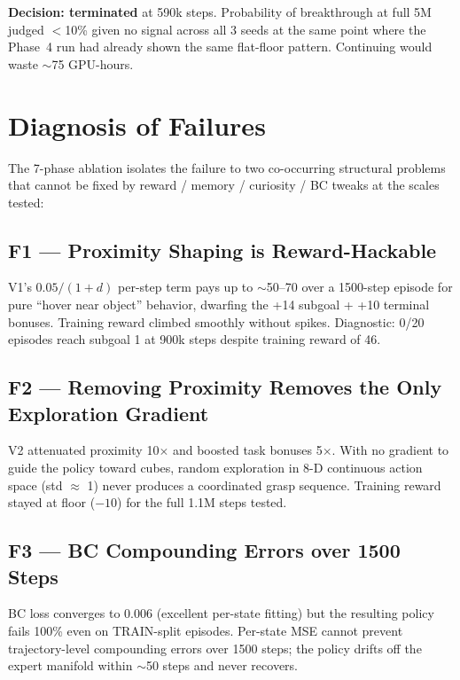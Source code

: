 \documentclass[11pt,letterpaper]{article}
\begin{document}
\begin{finding}
\textbf{Decision: terminated} at 590k steps.
Probability of breakthrough at full 5M judged $<$10\% given no signal across
all 3 seeds at the same point where the Phase~4 run had already shown the same
flat-floor pattern. Continuing would waste $\sim$75 GPU-hours.
\end{finding}

\section{Diagnosis of Failures}
\label{sec:diagnosis}

The 7-phase ablation isolates the failure to two co-occurring structural problems
that cannot be fixed by reward / memory / curiosity / BC tweaks at the scales tested:

\subsection{F1 — Proximity Shaping is Reward-Hackable}

V1's $0.05/(1+d)$ per-step term pays up to $\sim$50–70 over a 1500-step episode
for pure ``hover near object'' behavior, dwarfing the +14 subgoal + +10 terminal
bonuses. Training reward climbed smoothly without spikes. Diagnostic: 0/20
episodes reach subgoal 1 at 900k steps despite training reward of 46.

\subsection{F2 — Removing Proximity Removes the Only Exploration Gradient}

V2 attenuated proximity 10$\times$ and boosted task bonuses 5$\times$. With no
gradient to guide the policy toward cubes, random exploration in 8-D continuous
action space (std $\approx$ 1) never produces a coordinated grasp sequence.
Training reward stayed at floor ($-10$) for the full 1.1M steps tested.

\subsection{F3 — BC Compounding Errors over 1500 Steps}

BC loss converges to 0.006 (excellent per-state fitting) but the resulting
policy fails 100\% even on TRAIN-split episodes. Per-state MSE cannot prevent
trajectory-level compounding errors over 1500 steps; the policy drifts off the
expert manifold within $\sim$50 steps and never recovers.
\end{document}
